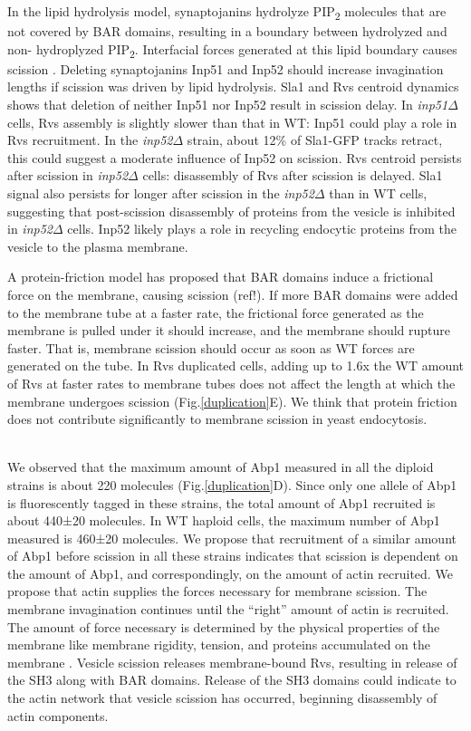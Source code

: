 \documentclass[9pt,lineno]{elife}
\begin{document}
In the lipid hydrolysis model, synaptojanins hydrolyze PIP\textsubscript{2}  molecules that are not covered by BAR domains, resulting in a boundary between hydrolyzed and non- hydroplyzed PIP\textsubscript{2}. Interfacial forces generated at this lipid boundary causes scission \citep{Liu2006}. Deleting  synaptojanins Inp51 and Inp52 should increase invagination lengths if scission was driven by lipid hydrolysis. Sla1 and Rvs centroid dynamics shows that deletion of neither Inp51 nor Inp52 result in scission delay. In \textit{inp51$\Delta$}  cells, Rvs assembly is slightly slower than that in WT: Inp51 could play a role in Rvs recruitment. In the \textit{inp52$\Delta$}  strain, about 12\% of Sla1-GFP tracks retract, this could suggest a moderate influence of Inp52 on scission. Rvs centroid persists after scission in \textit{inp52$\Delta$}  cells: disassembly of Rvs after scission is delayed. Sla1 signal also persists for longer after scission in the \textit{inp52$\Delta$} than in WT cells, suggesting that post-scission disassembly of proteins from the vesicle is inhibited in \textit{inp52$\Delta$}  cells. Inp52 likely plays a role in recycling endocytic proteins from the vesicle to the plasma membrane. 

A protein-friction model has proposed that BAR domains induce a frictional force on the membrane, causing scission (ref!). If more BAR domains were added to the membrane tube at a faster rate, the frictional  force generated as the membrane is pulled under it should increase, and the membrane should rupture faster. That is, membrane scission should occur as soon as WT forces are generated on the tube. In Rvs duplicated cells, adding up to 1.6x the WT amount of Rvs at faster rates to membrane tubes does not affect the length at which the membrane undergoes scission (Fig.\ref{duplication}E). We think that protein friction does not contribute significantly to membrane scission in yeast endocytosis. 

~\\
We  observed that the maximum amount of Abp1 measured in all the diploid strains is about 220 molecules (Fig.\ref{duplication}D). Since only one allele of Abp1 is fluorescently tagged in these strains, the total amount of Abp1 recruited is  about 440±20 molecules. In WT haploid cells, the maximum number of Abp1 measured is 460±20 molecules. We propose that recruitment of a similar amount of Abp1 before scission in all these strains indicates that scission is dependent on the amount of Abp1, and correspondingly, on the amount of actin recruited. We propose that actin supplies the forces necessary for membrane scission. The membrane invagination continues until the “right” amount of actin is recruited. The amount of force necessary is determined by the physical properties of the membrane like membrane rigidity, tension, and proteins accumulated on the membrane \citep{Dmitrieff2015}. Vesicle scission releases membrane-bound Rvs, resulting in release of the SH3 along with BAR domains. Release of the SH3 domains could indicate to the actin network that vesicle scission has occurred, beginning disassembly of actin components. 
\end{document}
